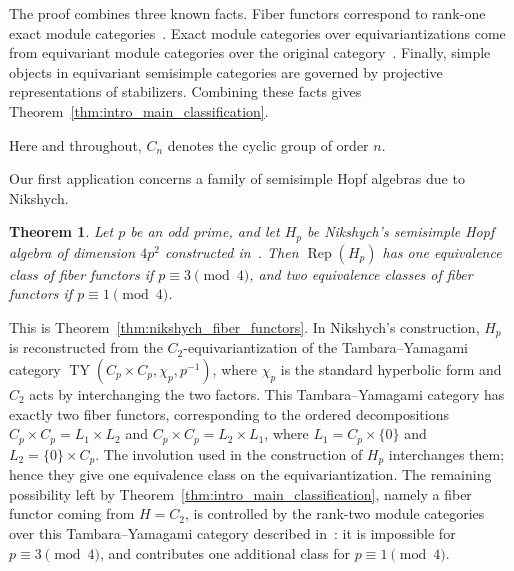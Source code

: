 \documentclass[12pt]{amsart}
\theoremstyle{plain}
\newtheorem{theorem}{Theorem}[section]
\theoremstyle{definition} %
\theoremstyle{remark} %
\newcommand{\TY}{\operatorname{TY}}
\newcommand{\Rep}{\operatorname{Rep}}
\begin{document}
The proof combines three known facts. Fiber functors correspond to rank-one exact module categories~\cite[Proposition~7.3.3 and Example~7.4.6]{EGNO15}. Exact module categories over equivariantizations come from equivariant module categories over the original category~\cite{GM11}. Finally, simple objects in equivariant semisimple categories are governed by projective representations of stabilizers. Combining these facts gives Theorem~\ref{thm:intro_main_classification}.

Here and throughout, $C_n$ denotes the cyclic group of order $n$.

Our first application concerns a family of semisimple Hopf algebras due to Nikshych.

\begin{theorem}\label{thm:intro_nikshych}
Let $p$ be an odd prime, and let $H_p$ be Nikshych's semisimple Hopf algebra of dimension $4p^2$ constructed in~\cite{Nik08}. Then $\Rep(H_p)$ has one equivalence class of fiber functors if $p\equiv3\pmod4$, and two equivalence classes of fiber functors if $p\equiv1\pmod4$.
\end{theorem}

This is Theorem~\ref{thm:nikshych_fiber_functors}. In Nikshych's construction, $H_p$ is reconstructed from the $C_2$-equivariantization of the Tambara--Yamagami category $\TY(C_p\times C_p,\chi_p,p^{-1})$, where $\chi_p$ is the standard hyperbolic form and $C_2$ acts by interchanging the two factors. This Tambara--Yamagami category has exactly two fiber functors, corresponding to the ordered decompositions $C_p\times C_p=L_1\times L_2$ and $C_p\times C_p=L_2\times L_1$, where $L_1=C_p\times\{0\}$ and $L_2=\{0\}\times C_p$. The involution used in the construction of $H_p$ interchanges them; hence they give one equivalence class on the equivariantization. The remaining possibility left by Theorem~\ref{thm:intro_main_classification}, namely a fiber functor coming from $H=C_2$, is controlled by the rank-two module categories over this Tambara--Yamagami category described in~\cite{Nik08}: it is impossible for $p\equiv3\pmod4$, and contributes one additional class for $p\equiv1\pmod4$.
\end{document}
